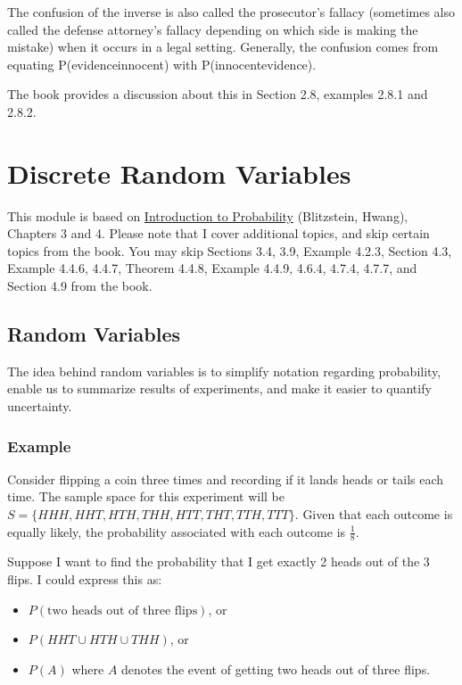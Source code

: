 \documentclass[
]{book}
\providecommand{\tightlist}{%
  \setlength{\itemsep}{0pt}\setlength{\parskip}{0pt}}
\begin{document}
The confusion of the inverse is also called the prosecutor's fallacy (sometimes also called the defense attorney's fallacy depending on which side is making the mistake) when it occurs in a legal setting. Generally, the confusion comes from equating P(evidence\textbar innocent) with P(innocent\textbar evidence).

The book provides a discussion about this in Section 2.8, examples 2.8.1 and 2.8.2.

\hypertarget{discrete-random-variables}{%
\chapter{Discrete Random Variables}\label{discrete-random-variables}}

This module is based on \href{https://stat110.hsites.harvard.edu/}{Introduction to Probability} (Blitzstein, Hwang), Chapters 3 and 4. Please note that I cover additional topics, and skip certain topics from the book. You may skip Sections 3.4, 3.9, Example 4.2.3, Section 4.3, Example 4.4.6, 4.4.7, Theorem 4.4.8, Example 4.4.9, 4.6.4, 4.7.4, 4.7.7, and Section 4.9 from the book.

\hypertarget{random-variables}{%
\section{Random Variables}\label{random-variables}}

The idea behind random variables is to simplify notation regarding probability, enable us to summarize results of experiments, and make it easier to quantify uncertainty.

\hypertarget{example}{%
\subsection{Example}\label{example}}

Consider flipping a coin three times and recording if it lands heads or tails each time. The sample space for this experiment will be \(S = \{HHH, HHT, HTH, THH, HTT, THT, TTH, TTT\}\). Given that each outcome is equally likely, the probability associated with each outcome is \(\frac{1}{8}\).

Suppose I want to find the probability that I get exactly 2 heads out of the 3 flips. I could express this as:

\begin{itemize}
\tightlist
\item
  \(P(\text{two heads out of three flips})\), or
\item
  \(P(HHT \cup HTH \cup THH)\), or
\item
  \(P(A)\) where \(A\) denotes the event of getting two heads out of three flips.
\end{itemize}
\end{document}
